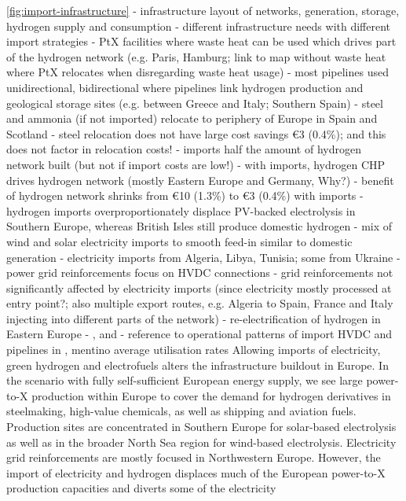 \cref{fig:import-infrastructure}
- infrastructure layout of networks, generation, storage, hydrogen supply and consumption
- different infrastructure needs with different import strategies
- PtX facilities where waste heat can be used which drives part of the hydrogen network (e.g. Paris, Hamburg; link to map without waste heat where PtX relocates when disregarding waste heat usage)
- most pipelines used unidirectional, bidirectional where pipelines link hydrogen production and geological storage sites (e.g. between Greece and Italy; Southern Spain)
- steel and ammonia (if not imported) relocate to periphery of Europe in Spain and Scotland
- steel relocation does not have large cost savings \euro{3} (0.4\%); and this does not factor in relocation costs!
- imports half the amount of hydrogen network built (but not if import costs are low!)
- with imports, hydrogen CHP drives hydrogen network (mostly Eastern Europe and Germany, Why?)
- benefit of hydrogen network shrinks from \euro{10} (1.3\%) to \euro{3} (0.4\%) with imports
- hydrogen imports overproportionately displace PV-backed electrolysis in Southern Europe, whereas British Isles still produce domestic hydrogen
- mix of wind and solar electricity imports to smooth feed-in similar to domestic generation
- electricity imports from Algeria, Libya, Tunisia; some from Ukraine
- power grid reinforcements focus on HVDC connections
- grid reinforcements not significantly affected by electricity imports (since electricity mostly processed at entry point?; also multiple export routes, e.g. Algeria to Spain, France and Italy injecting into different parts of the network)
- re-electrification of hydrogen in Eastern Europe
- ,  and 
- reference to operational patterns of import HVDC and pipelines in , mentino average utilisation rates
Allowing imports of electricity, green hydrogen and electrofuels alters the
infrastructure buildout in Europe. In the scenario with fully
self-sufficient European energy supply, we see large \mbox{power-to-X}
production within Europe to cover the demand for hydrogen derivatives in
steelmaking, high-value chemicals, as well as shipping and aviation fuels.
Production sites are concentrated in Southern Europe for solar-based
electrolysis as well as in the broader North Sea region for wind-based
electrolysis. Electricity grid reinforcements are mostly focused in Northwestern
Europe. However, the import of electricity and hydrogen displaces much of the
European power-to-X production capacities and diverts some of the electricity
